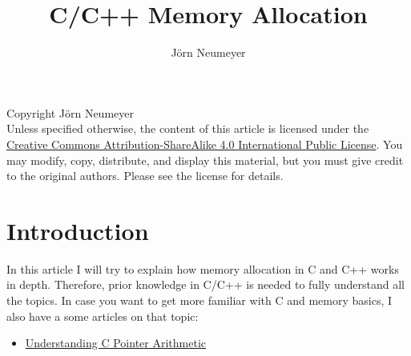 \documentclass{article}
\author{J\"orn Neumeyer}
\title{C/C++ Memory Allocation}
\begin{document}
  \maketitle
  Copyright \textcopyright {} J\"orn Neumeyer\\
  Unless specified otherwise, the content of this article is licensed under the \href{https://creativecommons.org/licenses/by-sa/4.0/legalcode}{Creative Commons Attribution-ShareAlike 4.0 International Public License}.
  You may modify, copy, distribute, and display this material, but you must give credit to the original authors. Please see the license for details.
  \tableofcontents
  \section{Introduction}
  In this article I will try to explain how memory allocation in C and C++ works in depth.
  Therefore, prior knowledge in C/C++ is needed to fully understand all the topics.
  In case you want to get more familiar with C and memory basics, I also have a some articles on that topic:
  \begin{itemize}
    \item \href{https://joern-neumeyer.de/articles/c-pointer-arithmetic/c-pointer-arithmetic.pdf}{Understanding C Pointer Arithmetic}
  \end{itemize}
\end{document}
